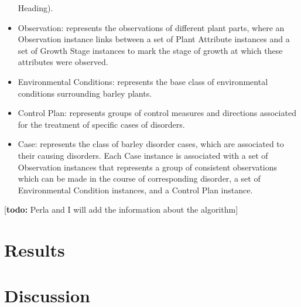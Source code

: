 \documentclass{frontiersSCNS} %
\newcommand{\todo}[1]{
  \rule{0pt}{0pt}\marginpar{{\color{blue}\rule{1ex}{1ex}}}
  {[\textbf{\color{blue}todo:} #1]}}
\begin{document}
\begin{itemize}
Heading).
\item Observation: represents the observations of different plant parts, where an Observation
instance links between a set of Plant Attribute instances and a set of Growth Stage instances
to mark the stage of growth at which these attributes were observed.
\item Environmental Conditions: represents the base class of environmental conditions
surrounding barley plants.
\item Control Plan: represents groups of control measures and directions associated for the
treatment of specific cases of disorders.
\item Case: represents the class of barley disorder cases, which are associated to their causing
disorders. Each Case instance is associated with a set of Observation instances that
represents a group of consistent observations which can be made in the course of
corresponding disorder, a set of Environmental Condition instances, and a Control Plan
instance.
\end{itemize}

\todo{Perla and I will add the information about the algorithm}

\section{Results}








\section{Discussion}
\end{document}
